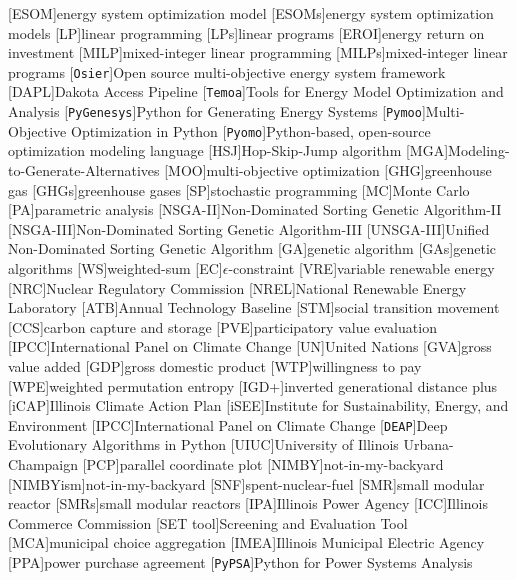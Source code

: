 [ESOM]{energy system optimization model}
[ESOMs]{energy system optimization models}
[LP]{linear programming}
[LPs]{linear programs}
[EROI]{energy return on investment}
[MILP]{mixed-integer linear programming}
[MILPs]{mixed-integer linear programs}
[\texttt{Osier}]{Open source multi-objective energy system framework}
[DAPL]{Dakota Access Pipeline}
[\texttt{Temoa}]{Tools for Energy Model Optimization and Analysis}
[\texttt{PyGenesys}]{Python for Generating Energy Systems}
[\texttt{Pymoo}]{Multi-Objective Optimization in Python}
[\texttt{Pyomo}]{Python-based, open-source optimization modeling language}
[HSJ]{Hop-Skip-Jump algorithm}
[MGA]{Modeling-to-Generate-Alternatives}
[MOO]{multi-objective optimization}
[GHG]{greenhouse gas}
[GHGs]{greenhouse gases}
[SP]{stochastic programming}
[MC]{Monte Carlo}
[PA]{parametric analysis}
[NSGA-II]{Non-Dominated Sorting Genetic Algorithm-II}
[NSGA-III]{Non-Dominated Sorting Genetic Algorithm-III}
[UNSGA-III]{Unified Non-Dominated Sorting Genetic Algorithm}
[GA]{genetic algorithm}
[GAs]{genetic algorithms}
[WS]{weighted-sum}
[EC]{$\epsilon$-constraint}
[VRE]{variable renewable energy}
[NRC]{Nuclear Regulatory Commission}
[NREL]{National Renewable Energy Laboratory}
[ATB]{Annual Technology Baseline}
[STM]{social transition movement}
[CCS]{carbon capture and storage}
[PVE]{participatory value evaluation}
[IPCC]{International Panel on Climate Change}
[UN]{United Nations}
[GVA]{gross value added}
[GDP]{gross domestic product}
[WTP]{willingness to pay}
[WPE]{weighted permutation entropy}
[IGD+]{inverted generational distance plus}
[iCAP]{Illinois Climate Action Plan}
[iSEE]{Institute for Sustainability, Energy, and Environment}
[IPCC]{International Panel on Climate Change}
[\texttt{DEAP}]{Deep Evolutionary Algorithms in Python}
[UIUC]{University of Illinois Urbana-Champaign}
[PCP]{parallel coordinate plot}
[NIMBY]{not-in-my-backyard}
[NIMBYism]{not-in-my-backyard}
[SNF]{spent-nuclear-fuel}
[SMR]{small modular reactor}
[SMRs]{small modular reactors}
[IPA]{Illinois Power Agency}
[ICC]{Illinois Commerce Commission}
[SET tool]{Screening and Evaluation Tool}
[MCA]{municipal choice aggregation}
[IMEA]{Illinois Municipal Electric Agency}
[PPA]{power purchase agreement}
[\texttt{PyPSA}]{Python for Power Systems Analysis}